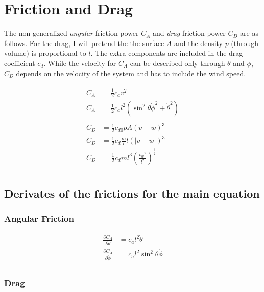 \documentclass{scrartcl}
\begin{document}

\section{Friction and Drag}

The non generalized \emph{angular} friction power $C_A$ and \emph{drag} friction power $C_D$ are as follows.
For the drag, I will pretend the the surface $A$ and the density $p$ (through volume) is proportional to $l$. The extra components are included in the drag coefficient $c_d$. While the velocity for $C_A$ can be described only through $\theta$ and $\phi$, $C_D$ depends on the velocity of the system and has to include the wind speed.

\begin{align}
  \begin{split}
  C_A &= \frac{1}{2} c_a v^2							                              \\
  C_A &= \frac{1}{2} c_a l^2 (\sin^2\theta \dot{\phi}^2 + \dot{\theta}^2)
  \end{split}
  \\
  \begin{split}
  C_D &= \frac{1}{2} c_{d0} p A (v - w)^3    							            \\
  C_D &= \frac{1}{2} c_{d} \frac{m}{l} l (|v - w|)^3                               \\
  C_D &= \frac{1}{2} c_{d} m l^3 (\frac{{v_w}^2}{l^2})^{\frac{3}{2}}                              \\
  \end{split}
\end{align}


\subsection{Derivates of the frictions for the main equation}
\subsubsection{Angular Friction}
\begin{align}
  \frac{\partial C_A}{\partial \dot{\theta}} &= c_a l^2 \dot{\theta} 	\\
  \frac{\partial C_A}{\partial \dot{\phi}}   &= c_a l^2 \sin^2\theta\dot{\phi} \\
\end{align}

\subsubsection{Drag}
\end{document}

